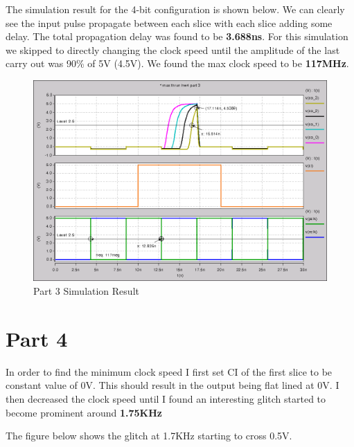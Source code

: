 \documentclass{article}
\begin{document}


\newpage
The simulation result for the 4-bit configuration is shown below. We can
clearly see the input pulse propagate between each slice with each slice adding
some delay. The total propagation delay was found to be \textbf{3.688ns}. For
this simulation we skipped to directly changing the clock speed until the
amplitude of the last carry out was 90\% of 5V (4.5V). We found the max clock
speed to be \textbf{117MHz}.

\begin{figure}[H]
    \centering
    \includegraphics[width=\linewidth]{../part_3.png}
    \caption{Part 3 Simulation Result}
\end{figure}

\newpage
\section*{Part 4}

In order to find the minimum clock speed I first set CI of the first slice to
be constant value of 0V. This should result in the output being flat lined at
0V.  I then decreased the clock speed until I found an interesting glitch
started to become prominent around \textbf{1.75KHz}



\newpage
The figure below shows the glitch at 1.7KHz starting to cross 0.5V.
\end{document}
